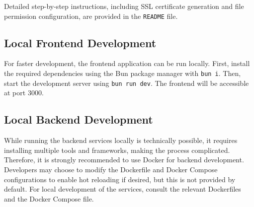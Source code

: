 Detailed step-by-step instructions, including SSL certificate generation and file permission configuration, are provided in the \lstinline|README| file.

\subsection{Local Frontend Development}
\label{sec:local-frontend-development}

For faster development, the frontend application can be run locally. First, install the required dependencies using the Bun package manager with \lstinline|bun i|. Then, start the development server using \lstinline|bun run dev|. The frontend will be accessible at port 3000.

\subsection{Local Backend Development}
\label{sec:local-backend-development}

While running the backend services locally is technically possible, it requires installing multiple tools and frameworks, making the process complicated. Therefore, it is strongly recommended to use Docker for backend development. Developers may choose to modify the Dockerfile and Docker Compose configurations to enable hot reloading if desired, but this is not provided by default. For local development of the services, consult the relevant Dockerfiles and the Docker Compose file.
